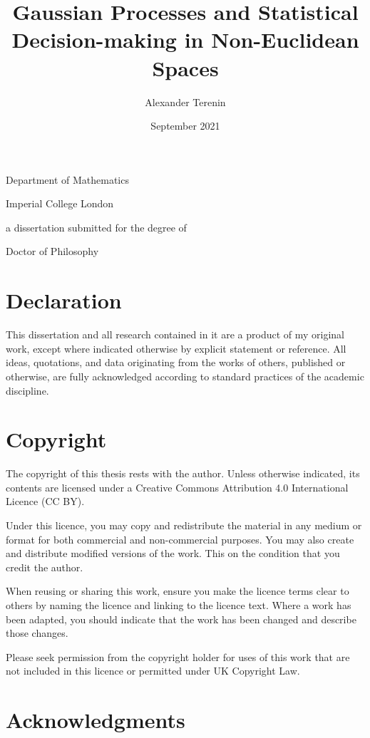 \documentclass[11pt]{book}
\title{Gaussian Processes and Statistical Decision-making in Non-Euclidean Spaces}
\author{Alexander Terenin}
\date{September 2021}
\begin{document}
\begin{titlepage}
\maketitlehooka
\centering
\huge
\null
\vfill
\thetitle
\par
\vfill
\LARGE
\theauthor
\par
\large
Department of Mathematics
\par
Imperial College London
\par
\vfill
\null
\vfill
a dissertation submitted for the degree of
\par
Doctor of Philosophy
\par
\strut
\par
\thedate
\par
\vfill
\null
\maketitlehookd
\end{titlepage}

\chapter*{Declaration}

This dissertation and all research contained in it are a product of my original work, except where indicated otherwise by explicit statement or reference.
All ideas, quotations, and data originating from the works of others, published or otherwise, are fully acknowledged according to standard practices of the academic discipline.

\chapter*{Copyright}

The copyright of this thesis rests with the author. Unless otherwise indicated, its contents are licensed under a Creative Commons Attribution 4.0 International Licence (CC BY).

Under this licence, you may copy and redistribute the material in any medium or format for both commercial and non-commercial purposes. You may also create and distribute modified versions of the work. This on the condition that you credit the author.

When reusing or sharing this work, ensure you make the licence terms clear to others by naming the licence and linking to the licence text. Where a work has been adapted, you should indicate that the work has been changed and describe those changes.

Please seek permission from the copyright holder for uses of this work that are not included in this licence or permitted under UK Copyright Law.

\chapter*{Acknowledgments}
\end{document}
